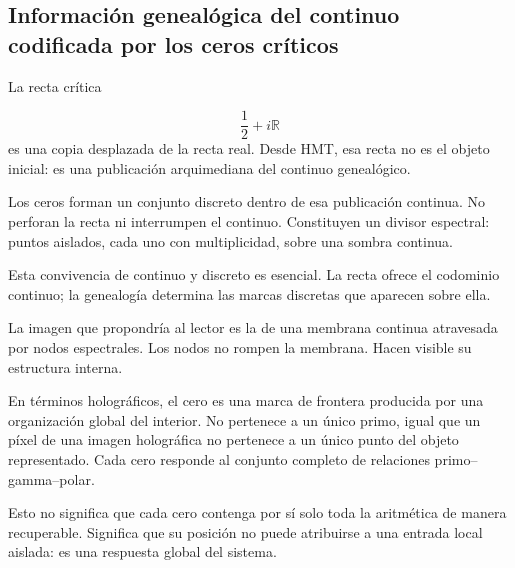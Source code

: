 \subsection{Información genealógica del continuo codificada por los ceros críticos}
La recta crítica\par
\[
\frac12+i\mathbb R
\]
es una copia desplazada de la recta real. Desde HMT, esa recta no es el objeto inicial: es una publicación arquimediana del continuo genealógico.\par
Los ceros forman un conjunto discreto dentro de esa publicación continua. No perforan la recta ni interrumpen el continuo. Constituyen un divisor espectral: puntos aislados, cada uno con multiplicidad, sobre una sombra continua.\par
Esta convivencia de continuo y discreto es esencial. La recta ofrece el codominio continuo; la genealogía determina las marcas discretas que aparecen sobre ella.\par
La imagen que propondría al lector es la de una membrana continua atravesada por nodos espectrales. Los nodos no rompen la membrana. Hacen visible su estructura interna.\par
En términos holográficos, el cero es una marca de frontera producida por una organización global del interior. No pertenece a un único primo, igual que un píxel de una imagen holográfica no pertenece a un único punto del objeto representado. Cada cero responde al conjunto completo de relaciones primo–gamma–polar.\par
Esto no significa que cada cero contenga por sí solo toda la aritmética de manera recuperable. Significa que su posición no puede atribuirse a una entrada local aislada: es una respuesta global del sistema.\par
{}
